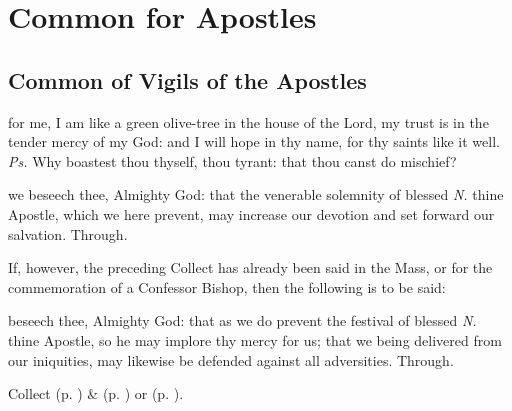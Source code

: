 \fancyhead[RO,LE]{}
\fancyhead[RE,LO]{}

\section{Common for Apostles}

\subsection{Common of Vigils of the Apostles}\label{CommonVigilApostles}

\introit
{} for me, I am like a green olive-tree in the house of the Lord, my trust is in the tender mercy of my God: and I will hope in thy name, for thy saints like it well. \textit{Ps.} Why boastest thou thyself, thou tyrant: that thou canst do mischief?

\collect
{} we beseech thee, Almighty God: that the venerable solemnity of blessed \textit{N.} thine Apostle, which we here prevent, may increase our devotion and set forward our salvation. Through.
\begin{rubric}
	If, however, the preceding Collect has already been said in the Mass, or for the commemoration of a Confessor Bishop, then the following is to be said:
\end{rubric}
 beseech thee, Almighty God: that as we do prevent the festival of blessed \textit{N.} thine Apostle, so he may implore thy mercy for us; that we being delivered from our iniquities, may likewise be defended against all adversities. Through.
\begin{rubric}
	 Collect  (p. \pageref{SPMaryInEaster}) \&   (p. \pageref{SPAgainst}) or  (p. \pageref{SPChiefBishop}).
\end{rubric}


